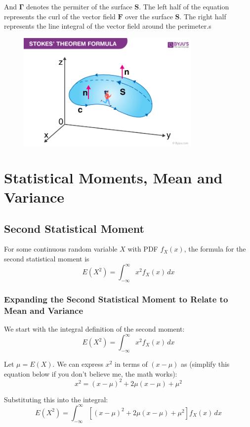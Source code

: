 \documentclass[12pt]{article}
\begin{document}
And \(\mathbf{\Gamma}\) denotes the permiter of the surface  \(\mathbf{S}\). The left half of the equation represents the curl of the vector field \(\mathbf{F}\) over the surface \(\mathbf{S}\). The right half represents the line integral of the vector field around the perimeter.s


\begin{figure}[H]
    \centering
    \includegraphics[width=0.8\textwidth]{./Stokes-Theorem-1.png} %
\end{figure}
\section{Statistical Moments, Mean and Variance}
\subsection{Second Statistical Moment}
For some continuous random variable \(X\) with PDF \(f_X(x)\), the formula for the second statistical moment is 
\[
E(X^2) = \int_{-\infty}^{\infty} x^2 f_X(x) \, dx
\]
\subsubsection{Expanding the Second Statistical Moment to Relate to Mean and Variance}

We start with the integral definition of the second moment:
\[
E(X^2) = \int_{-\infty}^{\infty} x^2 f_X(x) \, dx
\]

Let \(\mu = E(X)\). We can express \(x^2\) in terms of \((x - \mu)\) as (simplify this equation below if  you don't believe me, the math works):
\[
x^2 = (x - \mu)^2 + 2\mu(x - \mu) + \mu^2
\]

Substituting this into the integral:
\[
E(X^2) = \int_{-\infty}^{\infty} \left[ (x - \mu)^2 + 2\mu(x - \mu) + \mu^2 \right] f_X(x) \, dx
\]
\end{document}
